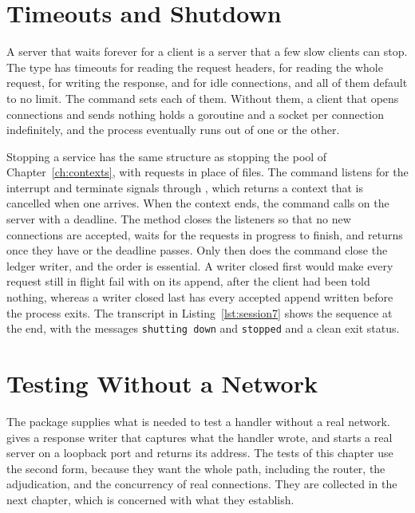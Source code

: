 \section{Timeouts and Shutdown}

A server that waits forever for a client is a server that a few slow clients can stop. The  type has timeouts for reading the request headers, for reading the whole request, for writing the response, and for idle connections, and all of them default to no limit. The command sets each of them. Without them, a client that opens connections and sends nothing holds a goroutine and a socket per connection indefinitely, and the process eventually runs out of one or the other.

Stopping a service has the same structure as stopping the pool of Chapter~\ref{ch:contexts}, with requests in place of files. The command listens for the interrupt and terminate signals through , which returns a context that is cancelled when one arrives. When the context ends, the command calls  on the server with a deadline. The method closes the listeners so that no new connections are accepted, waits for the requests in progress to finish, and returns once they have or the deadline passes. Only then does the command close the ledger writer, and the order is essential. A writer closed first would make every request still in flight fail with  on its append, after the client had been told nothing, whereas a writer closed last has every accepted append written before the process exits. The transcript in Listing~\ref{lst:session7} shows the sequence at the end, with the messages \texttt{shutting down} and \texttt{stopped} and a clean exit status.

\section{Testing Without a Network}

The package  supplies what is needed to test a handler without a real network.  gives a response writer that captures what the handler wrote, and  starts a real server on a loopback port and returns its address. The tests of this chapter use the second form, because they want the whole path, including the router, the adjudication, and the concurrency of real connections. They are collected in the next chapter, which is concerned with what they establish.


